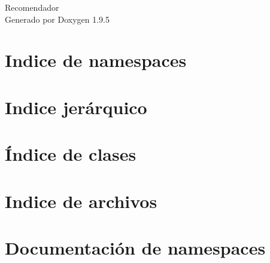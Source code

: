 \documentclass[twoside]{book}
\newcommand{\+}{\discretionary{\mbox{\scriptsize$\hookleftarrow$}}{}{}}
\newcommand{\clearemptydoublepage}{%
    \newpage{\pagestyle{empty}\cleardoublepage}%
  }
\begin{document}
  \raggedbottom
    \hypersetup{pageanchor=false,
                bookmarksnumbered=true,
                pdfencoding=unicode
               }
  \begin{titlepage}
  \vspace*{7cm}
  \begin{center}%
  {\Large Recomendador}\\
  \vspace*{1cm}
  {\large Generado por Doxygen 1.9.5}\\
  \end{center}
  \end{titlepage}
  \clearemptydoublepage
  \tableofcontents
  \clearemptydoublepage
  \hypersetup{pageanchor=true}
\chapter{Indice de namespaces}

\chapter{Indice jerárquico}

\chapter{Índice de clases}

\chapter{Indice de archivos}

\chapter{Documentación de namespaces}








\end{document}
